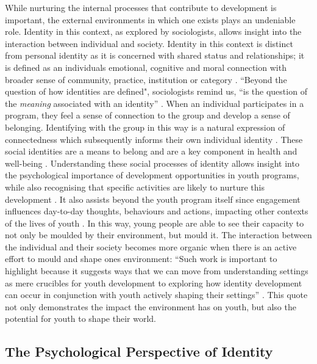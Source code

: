 While nurturing the internal processes that contribute to development is important, the external environments in which one exists plays an undeniable role. Identity in this context, as explored by sociologists, allows insight into the interaction between individual and society. Identity in this context is distinct from personal identity as it is concerned with shared status and relationships; it is defined as an individuals emotional, cognitive and moral connection with broader sense of community, practice, institution or category \citep[][p285]{Polletta2001}. “Beyond the question of how identities are defined", sociologists remind us, “is the question of the \textit{meaning} associated with an identity” \citep[][p83, emphasis added]{Deaux1991}. When an individual participates in a program, they feel a sense of connection to the group and develop a sense of belonging. Identifying with the group in this way is a natural expression of connectedness which subsequently informs their own individual identity \citep{Futch2016}. These social identities are a means to belong and are a key component in health and well-being \citep{Futch2016}. Understanding these social processes of identity allows insight into the psychological importance of development opportunities in youth programs, while also recognising that specific activities are likely to nurture this development \citep{Futch2016}. It also assists beyond the youth program itself since engagement influences day-to-day thoughts, behaviours and actions, impacting other contexts of the lives of youth \citep{Futch2016}. In this way, young people are able to see their capacity to not only be moulded by their environment, but mould it. The interaction between the individual and their society becomes more organic when there is an active effort to mould and shape ones environment: “Such work is important to highlight because it suggests ways that we can move from understanding settings as mere crucibles for youth development to exploring how identity development can occur in conjunction with youth actively shaping their settings” \citep[][p677]{Futch2016}. This quote not only demonstrates the impact the environment has on youth, but also the potential for youth to shape their world.


\subsection{The Psychological Perspective of Identity}

